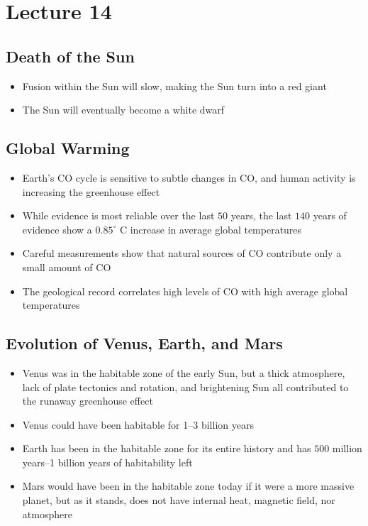 \documentclass[class=article, crop=false]{standalone}
\begin{document}
  \section{Lecture 14}
  \subsection{Death of the Sun}
  \begin{itemize}
    \item Fusion within the Sun will slow, making the Sun turn into a red giant
    \item The Sun will eventually become a white dwarf
  \end{itemize}
  \subsection{Global Warming}
  \begin{itemize}
    \item Earth's CO cycle is sensitive to subtle changes in CO, and human activity is increasing the greenhouse effect
    \item While evidence is most reliable over the last $50$ years, the last $140$ years of evidence show a $0.85^\circ$ C increase in average global temperatures
    \item Careful measurements show that natural sources of CO contribute only a small amount of CO
    \item The geological record correlates high levels of CO with high average global temperatures
  \end{itemize}
  \subsection{Evolution of Venus, Earth, and Mars}
  \begin{itemize}
    \item Venus was in the habitable zone of the early Sun, but a thick atmosphere, lack of plate tectonics and rotation, and brightening Sun all contributed to the runaway greenhouse effect
    \item Venus could have been habitable for 1--3 billion years
    \item Earth has been in the habitable zone for its entire history and has $500$ million years--1 billion years of habitability left
    \item Mars would have been in the habitable zone today if it were a more massive planet, but as it stands, does not have internal heat, magnetic field, nor atmosphere
  \end{itemize}
\end{document}
